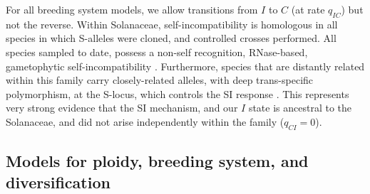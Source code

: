 For all breeding system models, we allow transitions from $I$ to $C$ (at rate $q_{IC}$) but not the reverse.
Within Solanaceae, self-incompatibility is homologous in all species in which S-alleles were cloned, and controlled crosses performed.  
All species sampled to date, possess a non-self recognition, RNase-based, gametophytic self-incompatibility \citep[shared even shared even with other euasterid families;][]{ramanauskas_2017}. %
Furthermore, species that are distantly related within this family carry closely-related alleles, with deep trans-specific polymorphism, at the S-locus, which controls the SI response \citep{ioerger_1990, igic_2006}. %
This represents very strong evidence that the SI mechanism, and our $I$ state is ancestral to the Solanaceae, and did not arise independently within the family ($q_{CI}=0$). %


\subsection{Models for ploidy, breeding system, and diversification}

